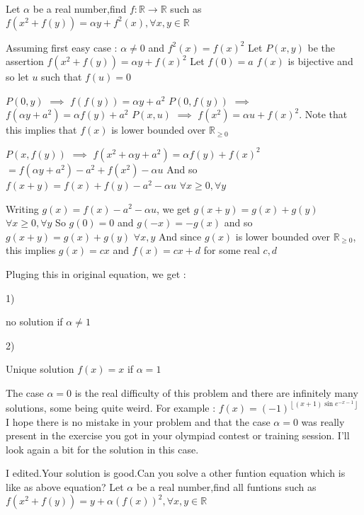 \begin{solution}
	\begin{tcolorbox}Let $\alpha$ be a real number,find $f:\mathbb{R}\to\mathbb{R}$  such as 
$f\left(x^2+f\left(y\right)\right)=\alpha y+f^2\left(x\right),\forall x,y\in\mathbb{R}$\end{tcolorbox}
Assuming first easy case : $\alpha\ne 0$ and $f^2(x)=f(x)^2$
Let $P(x,y)$ be the assertion $f(x^2+f(y))=\alpha y+f(x)^2$
Let $f(0)=a$
$f(x)$ is bijective and so let $u$ such that $f(u)=0$

$P(0,y)$ $\implies$ $f(f(y))=\alpha y+a^2$
$P(0,f(y))$ $\implies$ $f(\alpha y+a^2)=\alpha f(y)+a^2$
$P(x,u)$ $\implies$ $f(x^2)=\alpha u+f(x)^2$. Note that this implies that $f(x)$ is lower bounded over $\mathbb R_{\ge 0}$

$P(x,f(y))$ $\implies$ $f(x^2+\alpha y+a^2)=\alpha f(y)+f(x)^2$ $=f(\alpha y+a^2)-a^2+f(x^2)-\alpha u$
And so $f(x+y)=f(x)+f(y)-a^2-\alpha u$ $\forall x\ge 0,\forall y$

Writing $g(x)=f(x)-a^2-\alpha u$, we get $g(x+y)=g(x)+g(y)$ $\forall x\ge 0,\forall y$
So $g(0)=0$ and $g(-x)=-g(x)$ and so $g(x+y)=g(x)+g(y)$ $\forall x,y$
And since $g(x)$ is lower bounded over $\mathbb R_{\ge 0}$, this implies $g(x)=cx$ and $f(x)=cx+d$ for some real $c,d$

Pluging this in original equation, we get :
\begin{bolded}1)\end{bolded} no solution if $\alpha\ne 1$
\begin{bolded}2)\end{bolded} Unique solution $f(x)=x$ if $\alpha=1$

The case $\alpha=0$ is the real difficulty of this problem and there are infinitely many solutions, some being quite weird.
For example : $f(x)=(-1)^{\left\lfloor(x+1)\sin e^{-x-1}\right\rfloor}$ 
I hope there is no mistake in your problem and that the case $\alpha=0$ was really present in the exercise you got in your olympiad contest or training session.
I'll look again a bit for the solution in this case.
\end{solution}



\begin{solution}
	I edited.Your solution is good.Can you solve a other funtion equation which is like as above equation?
Let $\alpha$ be a real number,find all funtions such as
$f\left(x^2+f\left(y\right)\right)=y+\alpha\left(f\left(x\right)\right)^2,\forall x,y\in\mathbb{R}$
\end{solution}



